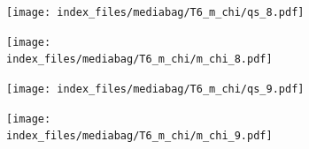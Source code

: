 \documentclass[
  11pt,
  letterpaper,
]{scrreprt}
\begin{document}
\begin{figure}

\begin{minipage}{0.50\linewidth}

\begin{figure}[H]

{\centering \texttt{[image: index\_files/mediabag/T6\_m\_chi/qs\_8.pdf]}

}


\end{figure}%

\end{minipage}%
%
\begin{minipage}{0.50\linewidth}

\begin{figure}[H]

{\centering \texttt{[image: index\_files/mediabag/T6\_m\_chi/m\_chi\_8.pdf]}

}


\end{figure}%

\end{minipage}%

\end{figure}%

\begin{figure}

\begin{minipage}{0.50\linewidth}

\begin{figure}[H]

{\centering \texttt{[image: index\_files/mediabag/T6\_m\_chi/qs\_9.pdf]}

}


\end{figure}%

\end{minipage}%
%
\begin{minipage}{0.50\linewidth}

\begin{figure}[H]

{\centering \texttt{[image: index\_files/mediabag/T6\_m\_chi/m\_chi\_9.pdf]}

}


\end{figure}%

\end{minipage}%

\end{figure}%
\end{document}
